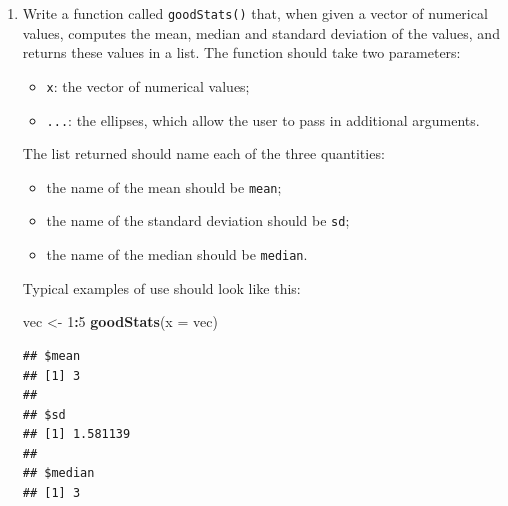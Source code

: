 \documentclass[]{book}
\makeatletter
\newenvironment{Shaded}{\begin{snugshade}}{\end{snugshade}}
\newcommand{\KeywordTok}[1]{\textcolor[rgb]{0.13,0.29,0.53}{\textbf{#1}}}
\newcommand{\DataTypeTok}[1]{\textcolor[rgb]{0.13,0.29,0.53}{#1}}
\newcommand{\DecValTok}[1]{\textcolor[rgb]{0.00,0.00,0.81}{#1}}
\newcommand{\StringTok}[1]{\textcolor[rgb]{0.31,0.60,0.02}{#1}}
\newcommand{\OperatorTok}[1]{\textcolor[rgb]{0.81,0.36,0.00}{\textbf{#1}}}
\newcommand{\NormalTok}[1]{#1}
\providecommand{\tightlist}{%
  \setlength{\itemsep}{0pt}\setlength{\parskip}{0pt}}
\newenvironment{kframe}{%
\medskip{}
\setlength{\fboxsep}{.8em}
 \def\at@end@of@kframe{}%
 \ifinner\ifhmode%
  \def\at@end@of@kframe{\end{minipage}}%
  \begin{minipage}{\columnwidth}%
 \fi\fi%
 \def\FrameCommand##1{\hskip\@totalleftmargin \hskip-\fboxsep
 \colorbox{shadecolor}{##1}\hskip-\fboxsep
     \hskip-\linewidth \hskip-\@totalleftmargin \hskip\columnwidth}%
 \MakeFramed {\advance\hsize-\width
   \@totalleftmargin\z@ \linewidth\hsize
   \@setminipage}}%
 {\par\unskip\endMakeFramed%
 \at@end@of@kframe}
\renewenvironment{Shaded}{\begin{kframe}}{\end{kframe}}
\theoremstyle{definition}
\theoremstyle{definition}
\theoremstyle{definition}
\theoremstyle{remark}
\makeatother
\begin{document}
{\begin{enumerate}
  For each of the following objects, find at least two ways to access it
  within \texttt{lst}:

  \begin{itemize}
  \tightlist
  \item
    the vector of letters from ``c'' to ``j'';
  \item
    the capital letter ``F'';
  \item
    the vector of numbers from 1 to 10;
  \item
    the heights of the five tallest individuals in \texttt{m111survey}.
  \end{itemize}
\item
  Write a function called \texttt{goodStats()} that, when given a vector
  of numerical values, computes the mean, median and standard deviation
  of the values, and returns these values in a list. The function should
  take two parameters:

  \begin{itemize}
  \tightlist
  \item
    \texttt{x}: the vector of numerical values;
  \item
    \texttt{...}: the ellipses, which allow the user to pass in
    additional arguments.
  \end{itemize}

  The list returned should name each of the three quantities:

  \begin{itemize}
  \tightlist
  \item
    the name of the mean should be \texttt{mean};
  \item
    the name of the standard deviation should be \texttt{sd};
  \item
    the name of the median should be \texttt{median}.
  \end{itemize}

  Typical examples of use should look like this:

\begin{Shaded}
\begin{Highlighting}[]
\NormalTok{vec <-}\StringTok{ }\DecValTok{1}\OperatorTok{:}\DecValTok{5}
\KeywordTok{goodStats}\NormalTok{(}\DataTypeTok{x =}\NormalTok{ vec)}
\end{Highlighting}
\end{Shaded}

\begin{verbatim}
## $mean
## [1] 3
## 
## $sd
## [1] 1.581139
## 
## $median
## [1] 3
\end{verbatim}


\end{enumerate}}
\end{document}
